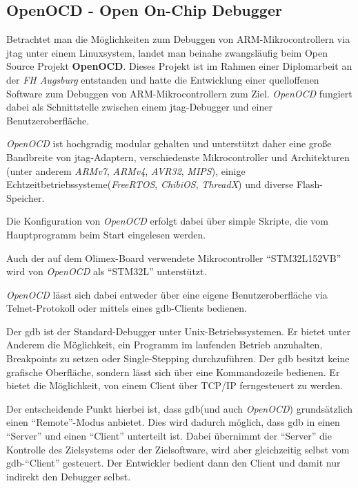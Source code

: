 \subsection{OpenOCD - Open On-Chip Debugger}
Betrachtet man die Möglichkeiten zum Debuggen von ARM-Mikrocontrollern via
\gls{jtag} unter einem Linuxsystem, landet man beinahe zwangsläufig beim Open
Source Projekt \textbf{OpenOCD}. Dieses Projekt ist im Rahmen einer
Diplomarbeit\cite{OOCD2} an der \emph{FH Augsburg} entstanden und hatte die
Entwicklung einer quelloffenen Software zum Debuggen von ARM-Mikrocontrollern zum Ziel.
\emph{OpenOCD} fungiert dabei als Schnittstelle zwischen einem \gls{jtag}-Debugger und
einer Benutzeroberfläche.

\emph{OpenOCD} ist hochgradig modular gehalten und unterstützt daher eine große
Bandbreite von \gls{jtag}-Adaptern, verschiedenste Mikrocontroller und
Architekturen (unter anderem \emph{ARMv7}, \emph{ARMv4}, \emph{AVR32},
\emph{MIPS}), einige Echtzeitbetriebssysteme(\emph{FreeRTOS}, \emph{ChibiOS},
\emph{ThreadX}) und diverse Flash-Speicher.

Die Konfiguration von \emph{OpenOCD} erfolgt dabei über simple Skripte, die vom
Hauptprogramm beim Start eingelesen werden.

Auch der auf dem Olimex-Board verwendete Mikrocontroller "`STM32L152VB"' wird
von \emph{OpenOCD} als "`STM32L"' unterstützt.

\emph{OpenOCD} lässt sich dabei entweder über eine eigene Benutzeroberfläche via
Telnet-Protokoll oder mittels eines \gls{gdb}-Clients bedienen.

\begin{definition}[GDB]
Der \gls{gdb} ist der Standard-Debugger unter
Unix-Betriebssystemen. Er bietet unter Anderem die Möglichkeit, ein Programm im
laufenden Betrieb anzuhalten, Breakpoints zu setzen oder Single-Stepping
durchzuführen. Der \gls{gdb} besitzt keine grafische Oberfläche, sondern
lässt sich über eine Kommandozeile bedienen. Er bietet die Möglichkeit, von
einem Client über TCP/IP ferngesteuert zu werden. 
\end{definition}

Der entscheidende Punkt hierbei ist, dass \gls{gdb}(und auch \emph{OpenOCD})
grundsätzlich einen "`Remote"'-Modus anbietet. Dies wird dadurch möglich, dass
\gls{gdb} in einen "`Server"' und einen "`Client"' unterteilt ist. Dabei
übernimmt der "`Server"' die Kontrolle des Zielsystems oder der Zielsoftware,
wird aber gleichzeitig selbst vom \gls{gdb}-"`Client"' gesteuert. Der Entwickler
bedient dann den Client und damit nur indirekt den Debugger selbst.


